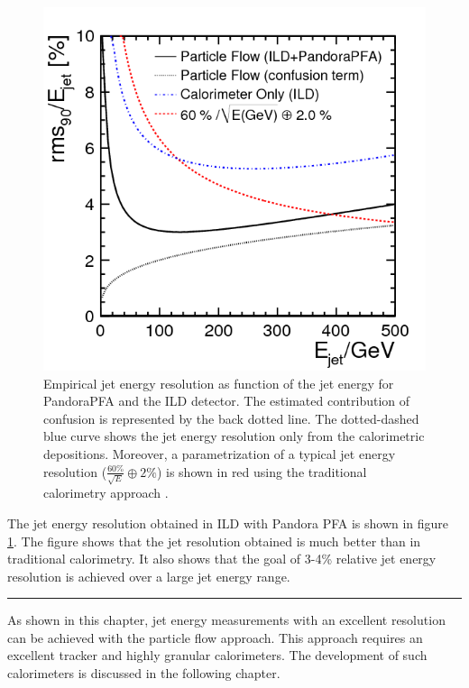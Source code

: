 \begin{figure}[htbp!]
  \centering
  \includegraphics[width=0.6\linewidth]{chap2/fig/pfa_figure_10.png}
  \caption{Empirical jet energy resolution as function of the jet energy for PandoraPFA and the ILD detector. The estimated contribution of confusion is represented by the back dotted line. The dotted-dashed blue curve shows the jet energy resolution only from the calorimetric depositions. Moreover, a parametrization of a typical jet energy resolution ($\frac{60\%}{\sqrt{E}} \oplus 2\%$) is shown in red using the traditional calorimetry approach \cite{Thomson:2009rp}.} \label{fig:ILDPFA}
\end{figure}

The jet energy resolution obtained in ILD with Pandora PFA is shown in figure \ref{fig:ILDPFA}. The figure shows that the jet resolution obtained is much better than in traditional calorimetry. It also shows that the goal of 3-4\% relative jet energy resolution is achieved over a large jet energy range.

\begin{center}
  \rule{0.5\textwidth}{.4pt}
\end{center}

As shown in this chapter, jet energy measurements with an excellent resolution can be achieved with the particle flow approach. This approach requires an excellent tracker and highly granular calorimeters. The development of such calorimeters is discussed in the following chapter.
